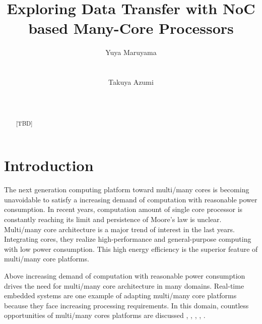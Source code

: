 \documentclass{sig-alternate-05-2015}
\author{
\alignauthor Yuya Maruyama\\
\affaddr{Graduate School of Engineering Science}\\
\affaddr{Osaka University}\\
\alignauthor Takuya Azumi\\
\affaddr{Graduate School of Engineering Science}\\
\affaddr{Osaka University}\\
}
\title{Exploring Data Transfer with NoC based Many-Core Processors}
\begin{document}

\maketitle

\setcounter{topnumber}{5}%
\def\topfraction{1.00}%
\setcounter{bottomnumber}{5}%
\def\bottomfraction{1.00}%
\setcounter{totalnumber}{10}%
\def\textfraction{0.00}%


\begin{abstract}
[TBD]
\end{abstract}



\section{Introduction}
The next generation computing platform toward multi/many cores is becoming unavoidable to satisfy a increasing demand of computation with reasonable power consumption.
In recent years, computation amount of single core processor is constantly reaching its limit and persistence of Moore's law \cite{moore2006cramming} is unclear.
Multi/many core architecture is a major trend of interest in the last years.
Integrating cores, they realize high-performance and general-purpose computing with low power consumption.
This high energy efficiency is the superior feature of multi/many core platforms.

Above increasing demand of computation with reasonable power consumption drives the need for multi/many core architecture in many domains.
Real-time embedded systems are one example of adapting multi/many core platforms because they face increasing processing requirements.
In this domain, countless opportunities of multi/many cores platforms are discussed \cite{becker2016contention}, \cite{saidi2015shift}, \cite{perret2016temporal}, \cite{perret2016mapping}, \cite{becker2014mapping}.
\end{document}
